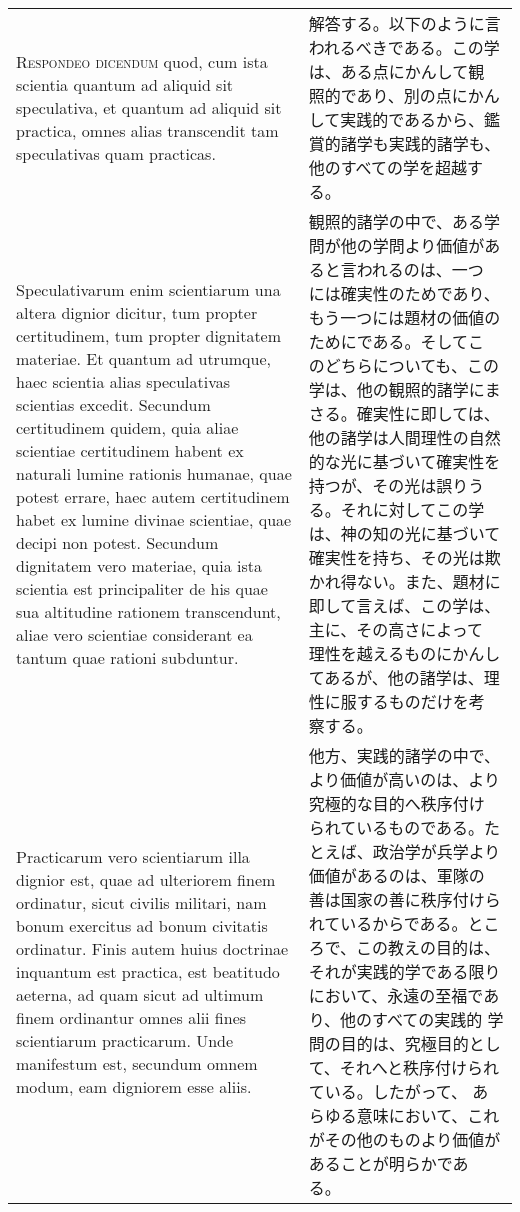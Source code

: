 \documentclass[10pt]{jsarticle}
\begin{document}
\begin{longtable}{p{21em}p{21em}}
\\


{\scshape Respondeo dicendum} quod, cum ista scientia
quantum ad aliquid sit speculativa, et quantum ad aliquid sit practica,
omnes alias transcendit tam speculativas quam practicas. 

&

解答する。以下のように言われるべきである。この学は、ある点にかんして観
照的であり、別の点にかんして実践的であるから、鑑賞的諸学も実践的諸学も、
他のすべての学を超越する。


\\


Speculativarum enim scientiarum una altera dignior dicitur, tum
propter certitudinem, tum propter dignitatem materiae.  Et quantum ad
utrumque, haec scientia alias speculativas scientias excedit. Secundum
certitudinem quidem, quia aliae scientiae certitudinem habent ex
naturali lumine rationis humanae, quae potest errare, haec autem
certitudinem habet ex lumine divinae scientiae, quae decipi non
potest. Secundum dignitatem vero materiae, quia ista scientia est
principaliter de his quae sua altitudine rationem transcendunt, aliae
vero scientiae considerant ea tantum quae rationi subduntur.



&


観照的諸学の中で、ある学問が他の学問より価値があると言われるのは、一つ
には確実性のためであり、もう一つには題材の価値のためにである。そしてこ
のどちらについても、この学は、他の観照的諸学にまさる。確実性に即しては、
他の諸学は人間理性の自然的な光に基づいて確実性を持つが、その光は誤りう
る。それに対してこの学は、神の知の光に基づいて確実性を持ち、その光は欺
かれ得ない。また、題材に即して言えば、この学は、主に、その高さによって
理性を越えるものにかんしてあるが、他の諸学は、理性に服するものだけを考
察する。

\\


Practicarum vero scientiarum illa dignior est, quae ad ulteriorem
finem ordinatur, sicut civilis militari, nam bonum exercitus ad bonum
civitatis ordinatur. Finis autem huius doctrinae inquantum est
practica, est beatitudo aeterna, ad quam sicut ad ultimum finem
ordinantur omnes alii fines scientiarum practicarum. Unde manifestum
est, secundum omnem modum, eam digniorem esse aliis.


&

他方、実践的諸学の中で、より価値が高いのは、より究極的な目的へ秩序付け
られているものである。たとえば、政治学が兵学より価値があるのは、軍隊の
善は国家の善に秩序付けられているからである。ところで、この教えの目的は、
それが実践的学である限りにおいて、永遠の至福であり、他のすべての実践的
学問の目的は、究極目的として、それへと秩序付けられている。したがって、
あらゆる意味において、これがその他のものより価値があることが明らかであ
る。



\end{longtable}
\end{document}
